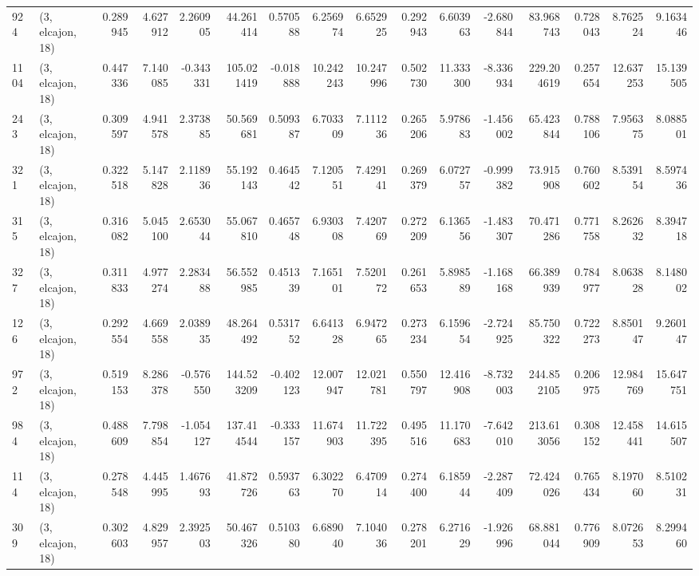 \begin{tabular}{llrrrrrrrrrrrrrr}
924  &  (3, elcajon, 18) &   0.289945 &   4.627912 &   2.260905 &     44.261414 &    0.570588 &    6.256974 &    6.652925 &  0.292943 &   6.603963 &  -2.680844 &    83.968743 &   0.728043 &   8.762524 &   9.163446 \\
1104 &  (3, elcajon, 18) &   0.447336 &   7.140085 &  -0.343331 &    105.021419 &   -0.018888 &   10.242243 &   10.247996 &  0.502730 &  11.333300 &  -8.336934 &   229.204619 &   0.257654 &  12.637253 &  15.139505 \\
243  &  (3, elcajon, 18) &   0.309597 &   4.941578 &   2.373885 &     50.569681 &    0.509387 &    6.703309 &    7.111236 &  0.265206 &   5.978683 &  -1.456002 &    65.423844 &   0.788106 &   7.956375 &   8.088501 \\
321  &  (3, elcajon, 18) &   0.322518 &   5.147828 &   2.118936 &     55.192143 &    0.464542 &    7.120551 &    7.429141 &  0.269379 &   6.072757 &  -0.999382 &    73.915908 &   0.760602 &   8.539154 &   8.597436 \\
315  &  (3, elcajon, 18) &   0.316082 &   5.045100 &   2.653044 &     55.067810 &    0.465748 &    6.930308 &    7.420769 &  0.272209 &   6.136556 &  -1.483307 &    70.471286 &   0.771758 &   8.262632 &   8.394718 \\
327  &  (3, elcajon, 18) &   0.311833 &   4.977274 &   2.283488 &     56.552985 &    0.451339 &    7.165101 &    7.520172 &  0.261653 &   5.898589 &  -1.168168 &    66.389939 &   0.784977 &   8.063828 &   8.148002 \\
126  &  (3, elcajon, 18) &   0.292554 &   4.669558 &   2.038935 &     48.264492 &    0.531752 &    6.641328 &    6.947265 &  0.273234 &   6.159654 &  -2.724925 &    85.750322 &   0.722273 &   8.850147 &   9.260147 \\
972  &  (3, elcajon, 18) &   0.519153 &   8.286378 &  -0.576550 &    144.523209 &   -0.402123 &   12.007947 &   12.021781 &  0.550797 &  12.416908 &  -8.732003 &   244.852105 &   0.206975 &  12.984769 &  15.647751 \\
984  &  (3, elcajon, 18) &   0.488609 &   7.798854 &  -1.054127 &    137.414544 &   -0.333157 &   11.674903 &   11.722395 &  0.495516 &  11.170683 &  -7.642010 &   213.613056 &   0.308152 &  12.458441 &  14.615507 \\
114  &  (3, elcajon, 18) &   0.278548 &   4.445995 &   1.467693 &     41.872726 &    0.593763 &    6.302270 &    6.470914 &  0.274400 &   6.185944 &  -2.287409 &    72.424026 &   0.765434 &   8.197060 &   8.510231 \\
309  &  (3, elcajon, 18) &   0.302603 &   4.829957 &   2.392503 &     50.467326 &    0.510380 &    6.689040 &    7.104036 &  0.278201 &   6.271629 &  -1.926996 &    68.881044 &   0.776909 &   8.072653 &   8.299460 \\

\end{tabular}
